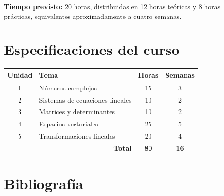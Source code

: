 \documentclass[12pt]{article}
\begin{document}
\textbf{Tiempo previsto:} 20 horas, distribuidas en 12 horas teóricas
y 8 horas prácticas, equivalentes aproximadamente a cuatro semanas.

\section{Especificaciones del curso}

\begin{center}
\begin{tabular}{|c|l|c|c|}
\hline
\textbf{Unidad} & \textbf{Tema} & \textbf{Horas} & \textbf{Semanas} \\ \hline
1 & Números complejos                & 15 & 3 \\ \hline
2 & Sistemas de ecuaciones lineales  & 10 & 2 \\ \hline
3 & Matrices y determinantes         & 10 & 2 \\ \hline
4 & Espacios vectoriales             & 25 & 5 \\ \hline
5 & Transformaciones lineales        & 20 & 4 \\ \hline
\multicolumn{2}{|r|}{\textbf{Total}} & \textbf{80} & \textbf{16} \\ \hline
\end{tabular}
\end{center}
\section{Bibliografía}
\end{document}
